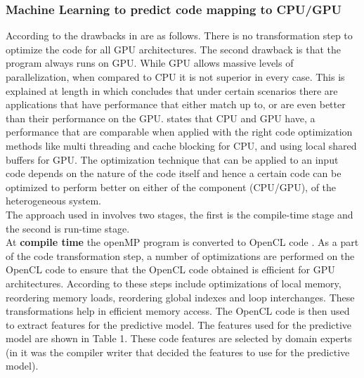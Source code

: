 \documentclass[a4paper,11pt]{article}
\begin{document}
 
 \subsubsection{Machine Learning to predict code mapping to CPU/GPU}
  \indent\indent According to \cite{second} the drawbacks in \cite{firstwork} are as follows. There is no transformation step to optimize the code for all GPU architectures. The second drawback is that the program always runs on GPU. While GPU allows massive levels of parallelization, when compared to CPU it is not superior in every case. This is explained at length in \cite{fourth} which concludes that under certain scenarios there are applications that have performance that either match up to, or are even better than their performance on the GPU. \cite{fifth} states that CPU and GPU have, a performance that are comparable when applied with the right code optimization methods like multi threading and cache blocking for CPU, and using local shared buffers for GPU. The optimization technique that can be applied to an input code depends on the nature of the code itself and hence a certain code can be optimized to perform better on either of the component (CPU/GPU), of the heterogeneous system.\\
  \indent The approach used in \cite{second} involves two stages, the first is the compile-time stage and the second is run-time stage.\\
  \indent At \textbf{compile time} the openMP program is converted to OpenCL code . As a part of the code transformation step, a number of optimizations are performed on the OpenCL code to ensure that the OpenCL code obtained is efficient for GPU architectures. According to \cite{second} these steps include optimizations of local memory, reordering memory loads, reordering global indexes and loop interchanges. These transformations help in efficient memory access. The OpenCL code is then used to extract features for the predictive model. The features used for the predictive model are shown in Table 1. These code features are selected by domain experts (in \cite{second} it was the compiler writer that decided the features to use for the predictive model).
\end{document}
